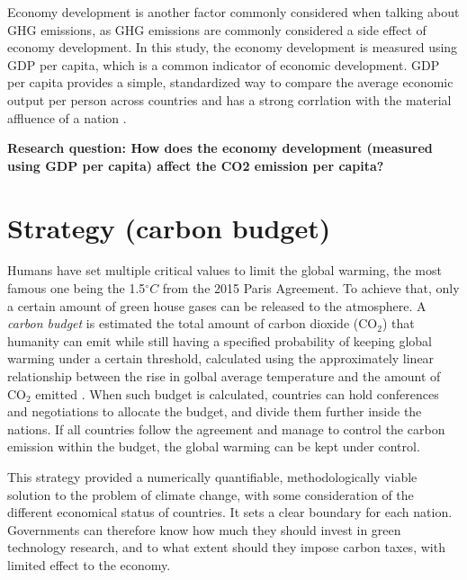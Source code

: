 \documentclass[a4paper]{article}
\begin{document}
Economy development is another factor commonly considered when talking about GHG emissions, as GHG emissions are commonly considered a side effect of economy development. In this study, the economy development is measured using GDP per capita, which is a common indicator of economic development. GDP per capita provides a simple, standardized way to compare the average economic output per person across countries and has a strong corrlation with the material affluence of a nation \cite{UNDP_HDR_2023}.

\textbf{Research question: How does the economy development (measured using GDP per capita) affect the CO2 emission per capita?}

\section{Strategy (carbon budget)}

Humans have set multiple critical values to limit the global warming, the most famous one being the 1.5$^\circ C$ from the 2015 Paris Agreement. To achieve that, only a certain amount of green house gases can be released to the atmosphere. A \textit{carbon budget} is estimated the total amount of carbon dioxide (CO$_2$) that humanity can emit while still having a specified probability of keeping global warming under a certain threshold, calculated using the approximately linear relationship between the rise in golbal average temperature and the amount of CO$_2$ emitted \cite{esd-15-387-2024}. When such budget is calculated, countries can hold conferences and negotiations to allocate the budget, and divide them further inside the nations. If all countries follow the agreement and manage to control the carbon emission within the budget, the global warming can be kept under control.

This strategy provided a numerically quantifiable, methodologically viable solution to the problem of climate change, with some consideration of the different economical status of countries. It sets a clear boundary for each nation. Governments can therefore know how much they should invest in green technology research, and to what extent should they impose carbon taxes, with limited effect to the economy. 
\end{document}
